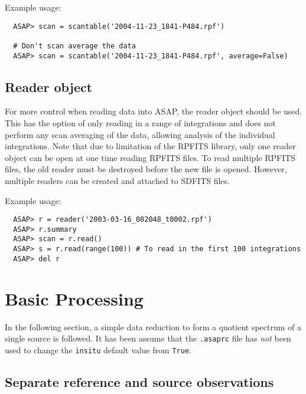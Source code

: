 \documentclass[11pt]{article}
\newcommand{\cmd}[1]{{\tt #1}}
\begin{document}
Example usage:

\begin{verbatim}
  ASAP> scan = scantable('2004-11-23_1841-P484.rpf')

  # Don't scan average the data
  ASAP> scan = scantable('2004-11-23_1841-P484.rpf', average=False)
\end{verbatim}


\subsection{Reader object}

For more control when reading data into ASAP, the reader object should
be used.  This has the option of only reading in a range of integrations
and does not perform any scan averaging of the data, allowing analysis
of the individual integrations.  Note that due to limitation of the
RPFITS library, only one reader object can be open at one time reading
RPFITS files.  To read multiple RPFITS files, the old reader must be
destroyed before the new file is opened.  However, multiple readers can
be created and attached to SDFITS files. 


Example usage:

\begin{verbatim}
  ASAP> r = reader('2003-03-16_082048_t0002.rpf')
  ASAP> r.summary 
  ASAP> scan = r.read()
  ASAP> s = r.read(range(100)) # To read in the first 100 integrations
  ASAP> del r
\end{verbatim}

\section{Basic Processing}

In the following section, a simple data reduction to form a quotient
spectrum of a single source is followed.  It has been assume that the
\cmd{.asaprc} file has {\em not} been used to change the \cmd{insitu}
default value from \cmd{True}.



\subsection{Separate reference and source observations}
\end{document}
